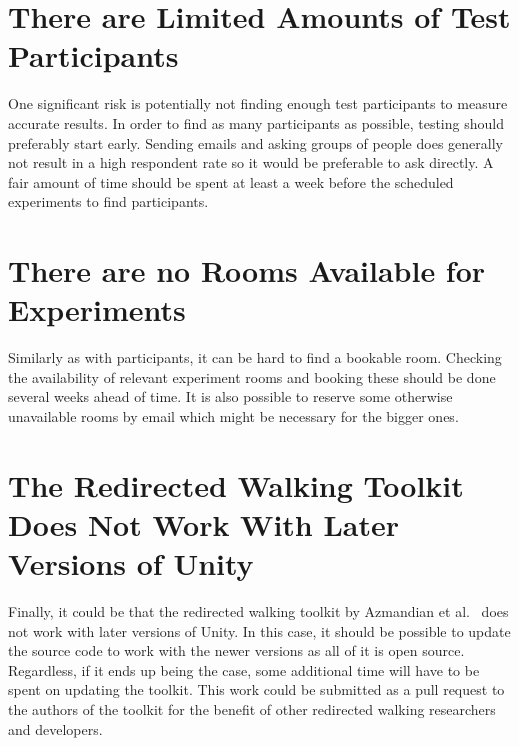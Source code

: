 \section{There are Limited Amounts of Test Participants}
One significant risk is potentially not finding enough test participants to measure accurate results. In order to find as many participants as possible, testing should preferably start early. Sending emails and asking groups of people does generally not result in a high respondent rate so it would be preferable to ask directly. A fair amount of time should be spent at least a week before the scheduled experiments to find participants. 

\section{There are no Rooms Available for Experiments}
Similarly as with participants, it can be hard to find a bookable room. Checking the availability of relevant experiment rooms and booking these should be done several weeks ahead of time. It is also possible to reserve some otherwise unavailable rooms by email which might be necessary for the bigger ones. 

\section{The Redirected Walking Toolkit Does Not Work With Later Versions of Unity}
Finally, it could be that the redirected walking toolkit by Azmandian et al.~\cite{azmandian2016redirected} does not work with later versions of Unity. In this case, it should be possible to update the source code to work with the newer versions as all of it is open source. Regardless, if it ends up being the case, some additional time will have to be spent on updating the toolkit. This work could be submitted as a pull request to the authors of the toolkit for the benefit of other redirected walking researchers and developers.  
